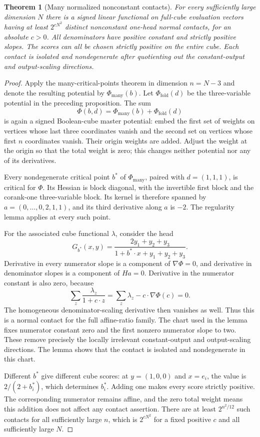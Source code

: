 \documentclass[11pt]{article}
\newtheorem{theorem}[proposition]{Theorem}
\begin{document}
\begin{theorem}[Many normalized nonconstant contacts]
For every sufficiently large dimension $N$ there is a signed linear
functional on full-cube evaluation vectors having at least
$2^{cN^2}$ distinct nonconstant one-head normal contacts, for an absolute
$c>0$. All denominators have positive constant and strictly positive
slopes. The scores can all be chosen strictly positive on the entire
cube. Each contact is isolated and nondegenerate after quotienting out
the constant-output and output-scaling directions.
\end{theorem}
\begin{proof}
Apply the many-critical-points theorem in dimension $n=N-3$ and denote
the resulting potential by $\Phi_{\mathrm{many}}(b)$.
Let $\Phi_{\mathrm{fold}}(d)$ be the three-variable potential in the
preceding proposition. The sum
\[
 \Phi(b,d)=\Phi_{\mathrm{many}}(b)+\Phi_{\mathrm{fold}}(d)
\]
is again a signed Boolean-cube master potential: embed the first set of
weights on vertices whose last three coordinates vanish and the second
set on vertices whose first $n$ coordinates vanish. Their origin weights
are added. Adjust the weight at the origin so that the total weight is
zero; this changes neither potential nor any of its derivatives.

Every nondegenerate critical point $b^*$ of
$\Phi_{\mathrm{many}}$, paired with $d=(1,1,1)$, is critical for
$\Phi$. Its Hessian is block diagonal, with the invertible first block
and the corank-one three-variable block. Its kernel is therefore spanned
by $a=(0,\ldots,0,2,1,1)$, and its third derivative along $a$ is $-2$.
The regularity lemma applies at every such point.

For the associated cube functional $\lambda$, consider the head
\[
 G_{b^*}(x,y)=
 \frac{2y_1+y_2+y_3}{1+b^*\cdot x+y_1+y_2+y_3}.
\]
Derivative in every numerator slope is a component of
$\nabla\Phi=0$, and derivative in denominator slopes is a component
of $Ha=0$. Derivative in the numerator constant is also zero, because
\[
 \sum_z\frac{\lambda_z}{1+c\cdot z}
 =\sum_z\lambda_z-c\cdot\nabla\Phi(c)=0.
\]
The homogeneous denominator-scaling derivative then vanishes as well.
Thus this is a normal contact for the full affine-ratio family.
The chart used in the lemma fixes numerator constant zero and the first
nonzero numerator slope to two. These remove precisely the locally
irrelevant constant-output and output-scaling directions. The lemma
shows that the contact is isolated and nondegenerate in this chart.

Different $b^*$ give different cube scores: at $y=(1,0,0)$ and
$x=e_i$, the value is $2/(2+b^*_i)$, which determines $b^*_i$.
Adding one makes every score strictly positive. The corresponding
numerator remains affine, and the zero total weight means this addition
does not affect any contact assertion. There are at least
$2^{n^2/12}$ such contacts for all sufficiently large $n$, which is
$2^{cN^2}$ for a fixed positive $c$ and all sufficiently large $N$.
\end{proof}
\end{document}
